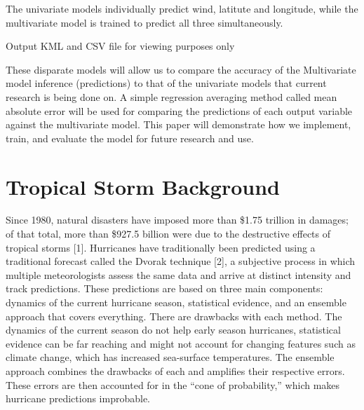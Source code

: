 \documentclass{article}
\begin{document}
The univariate models individually predict wind, latitute and longitude, while the multivariate model is trained to predict all three simultaneously.

Output KML and CSV file for viewing purposes only

These disparate models will allow us to compare the accuracy of the Multivariate model inference (predictions) to that of the univariate models that current research is being done on. A simple regression averaging method called mean absolute error will be used for comparing the predictions of each output variable against the multivariate model. This paper will demonstrate how we implement, train, and evaluate the model for future research and use.

\section{Tropical Storm Background}
Since 1980, natural disasters have imposed more than \$1.75 trillion in damages; of that total, more than \$927.5 billion were due to the destructive effects of tropical storms [1]. %
Hurricanes have traditionally been predicted using a traditional forecast called the Dvorak technique [2], a subjective process in which multiple meteorologists assess the same data and arrive at distinct intensity and track predictions. %
These predictions are based on three main components: dynamics of the current hurricane season, statistical evidence, and an ensemble approach that covers everything. %
There are drawbacks with each method. The dynamics of the current season do not help early season hurricanes, statistical evidence can be far reaching and might not account for changing features such as climate change, which has increased sea-surface temperatures. The ensemble approach combines the drawbacks of each and amplifies their respective errors. These errors are then accounted for in the ``cone of probability,'' which makes hurricane predictions improbable. %
\end{document}
